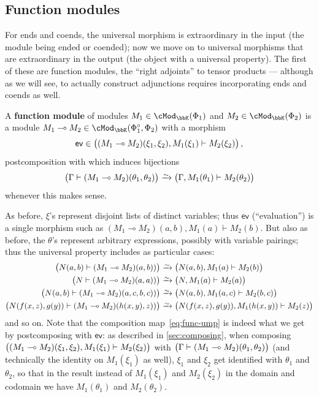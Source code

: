 \documentclass{amsart}
\newcommand{\K}{\bbK}
\let\mod\cMod
\def\modk{\mod_\K}
\renewcommand{\o}{^{\circ}}
\let\mto\vdash    %
\def\mhom#1#2{\left( #1 \vphantom{\big|}\mto #2 \right)}
\newcommand{\ev}{\mathsf{ev}}
\begin{document}
\subsection{Function modules}
\label{sec:func-mod}

For ends and coends, the universal morphism is extraordinary in the input (the module being ended or coended); now we move on to universal morphisms that are extraordinary in the output (the object with a universal property).
The first of these are function modules, the ``right adjoints'' to tensor products --- although as we will see, to actually construct adjunctions requires incorporating ends and coends as well.

\begin{defn}
  A \textbf{function module} of modules $M_1\in \modk(\Phi_1)$ and $M_2\in \modk(\Phi_2)$ is a module $M_1\multimap M_2 \in \modk(\Phi_1\o,\Phi_2)$ with a morphism
  \[\ev \in \mhom{(M_1\multimap M_2)(\xi_1,\xi_2), M_1(\xi_1)}{M_2(\xi_2)},\]
  postcomposition with which induces bijections
  \begin{equation}
    \mhom{\Gamma}{(M_1\multimap M_2)(\theta_1,\theta_2)} \toiso
    \mhom{\Gamma,M_1(\theta_1)}{M_2(\theta_2)}\label{eq:func-ump}
  \end{equation}
  whenever this makes sense.
\end{defn}

As before, $\xi$'s represent disjoint lists of distinct variables; thus $\ev$ (``evaluation'') is a single morphism such as $(M_1\multimap M_2)(a,b), M_1(a) \mto M_2(b)$.
But also as before, the $\theta$'s represent arbitrary expressions, possibly with variable pairings; thus the universal property includes as particular cases:
\begin{align*}
  \mhom{N(a,b)}{(M_1\multimap M_2)(a,b))} &\toiso \mhom{N(a,b),M_1(a)}{M_2(b)}\\
  \mhom{N}{(M_1\multimap M_2)(a,a))} &\toiso \mhom{N,M_1(a)}{M_2(a)}\\
  \mhom{N(a,b)}{(M_1\multimap M_2)(a,c,b,c))} &\toiso \mhom{N(a,b),M_1(a,c)}{M_2(b,c)}\\
  \mhom{N(f(x,z),g(y))}{(M_1\multimap M_2)(h(x,y),z))} &\toiso \mhom{N(f(x,z),g(y)),M_1(h(x,y))}{M_2(z)}
\end{align*}
and so on.
Note that the composition map~\eqref{eq:func-ump} is indeed what we get by postcomposing with $\ev$: as described in \cref{sec:composing}, when composing $\mhom{(M_1\multimap M_2)(\xi_1,\xi_2), M_1(\xi_1)}{M_2(\xi_2)}$ with $\mhom{\Gamma}{(M_1\multimap M_2)(\theta_1,\theta_2)}$ (and technically the identity on $M_1(\xi_1)$ as well), $\xi_1$ and $\xi_2$ get identified with $\theta_1$ and $\theta_2$, so that in the result instead of $M_1(\xi_1)$ and $M_2(\xi_2)$ in the domain and codomain we have $M_1(\theta_1)$ and $M_2(\theta_2)$.
\end{document}
